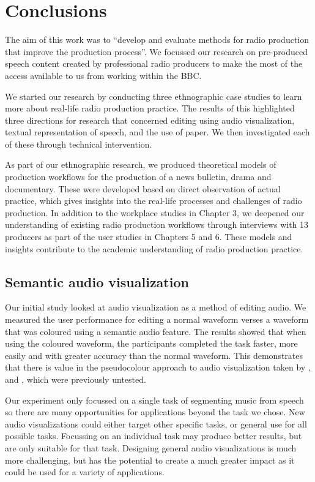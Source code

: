 \chapter{Conclusions}\label{chp:conclusions}

The aim of this work was to ``develop and evaluate methods for radio production that improve the production process''.
We focussed our research on pre-produced speech content created by professional radio producers to make the most of the
access available to us from working within the BBC.

We started our research by conducting three ethnographic case studies to learn more about real-life radio production
practice. The results of this highlighted three directions for research that concerned editing using audio
visualization, textual representation of speech, and the use of paper.  We then investigated each of these 
through technical intervention.

As part of our ethnographic research, we produced theoretical models of production workflows for the production of a
news bulletin, drama and documentary. These were developed based on direct observation of actual practice, which gives
insights into the real-life processes and challenges of radio production.
In addition to the workplace studies in Chapter 3, we deepened our understanding of existing radio production workflows
through interviews with 13 producers as part of the user studies in Chapters 5 and 6.
These models and insights contribute to the academic understanding of radio production practice.

\section{Semantic audio visualization}
Our initial study looked at audio visualization as a method of editing audio. We measured the user performance for
editing a normal waveform verses a waveform that was coloured using a semantic audio feature. The results showed that
when using the coloured waveform, the participants completed the task faster, more easily and with greater accuracy
than the normal waveform. This demonstrates that there is value in the pseudocolour approach to audio visualization
taken by \citet{Rice2005}, \citet{Akkermans2011} and \citet{Loviscach2011a}, which were previously untested.

Our experiment only focussed on a single task of segmenting music from speech so there are many opportunities for
applications beyond the task we chose. New audio visualizations could either target other specific tasks, or
general use for all possible tasks. Focussing on an individual task may produce better results, but are only suitable
for that task.  Designing general audio visualizations is much more challenging, but has the potential to create a much
greater impact as it could be used for a variety of applications.


